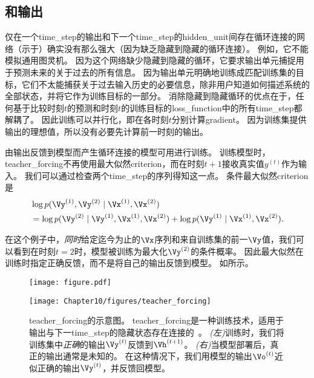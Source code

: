 
\subsection{和输出}
\label{sec:teacher_forcing_and_networks_with_output_recurrence}
仅在一个\gls{time_step}的输出和下一个\gls{time_step}的\gls{hidden_unit}间存在循环连接的网络（示于）确实没有那么强大（因为缺乏隐藏到隐藏的循环连接）。
例如，它不能模拟通用图灵机。
因为这个网络缺少隐藏到隐藏的循环，它要求输出单元捕捉用于预测未来的关于过去的所有信息。
因为输出单元明确地训练成匹配训练集的目标，它们不太能捕获关于过去输入历史的必要信息，除非用户知道如何描述系统的全部状态，并将它作为训练目标的一部分。
消除隐藏到隐藏循环的优点在于，任何基于比较时刻$t$的预测和时刻$t$的训练目标的\gls{loss_function}中的所有\gls{time_step}都解耦了。
因此训练可以并行化，即在各时刻$t$分别计算\gls{gradient}。
因为训练集提供输出的理想值，所以没有必要先计算前一时刻的输出。

由输出反馈到模型而产生循环连接的模型可用进行训练。
训练模型时，\gls{teacher_forcing}不再使用最大似然\gls{criterion}，而在时刻$t+1$接收真实值$y^{(t)}$作为输入。
我们可以通过检查两个\gls{time_step}的序列得知这一点。
条件最大似然\gls{criterion}是
\begin{align}
 &\log p(\Vy^{(1)},\Vy^{(2)} \mid \Vx^{(1)}, \Vx^{(2)} ) \\
 &= \log  p(\Vy^{(2)} \mid \Vy^{(1)}, \Vx^{(1)}, \Vx^{(2)} )  + \log p(\Vy^{(1)} \mid \Vx^{(1)}, \Vx^{(2)}) .
\end{align}


在这个例子中，\emph{同时}给定迄今为止的$\Vx$序列和来自训练集的前一$\Vy$值，我们可以看到在时刻$t=2$时，模型被训练为最大化$\Vy^{(2)}$的条件概率。
因此最大似然在训练时指定正确反馈，而不是将自己的输出反馈到模型。
如所示。
\begin{figure}[!htb]
\ifOpenSource
\centerline{\texttt{[image: figure.pdf]}}
\else
\centerline{\texttt{[image: Chapter10/figures/teacher\_forcing]}}
\fi
\caption{\gls{teacher_forcing}的示意图。
\gls{teacher_forcing}是一种训练技术，适用于输出与下一\gls{time_step}的隐藏状态存在连接的~。
\emph{(左)}训练时，我们将训练集中\emph{正确}的输出$\Vy^{(t)}$反馈到$\Vh^{(t+1)}$。
\emph{(右)}当模型部署后，真正的输出通常是未知的。
在这种情况下，我们用模型的输出$\Vo^{(t)}$近似正确的输出$\Vy^{(t)}$，并反馈回模型。
}
\label{fig:chap10_teacher_forcing}
\end{figure}


